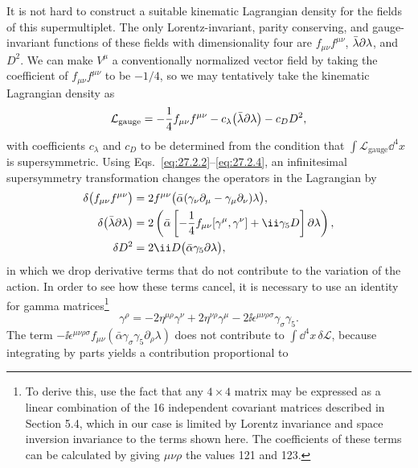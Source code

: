 It is not hard to construct a suitable kinematic Lagrangian density for
the fields of this supermultiplet. The only Lorentz-invariant, parity
conserving, and gauge-invariant functions of these fields with
dimensionality four are \(f_{\mu\nu}f^{\mu\nu}\),
\(\bar\lambda\sl{\partial}\lambda\), and \(D^2\). We can make \(V^\mu\) a
conventionally normalized vector field by taking the coefficient of
\(f_{\mu\nu}f^{\mu\nu}\) to be \(-1/4\), so we may tentatively take the
kinematic Lagrangian density as
\[
  \mathcal{L}_{\mathrm{gauge}}
  =-\frac14 f_{\mu\nu}f^{\mu\nu}
  -c_\lambda\bigl(\bar\lambda\sl{\partial}\lambda\bigr)
  -c_DD^2,
\]
with coefficients \(c_\lambda\) and \(c_D\) to be determined from the
condition that \(\int\mathcal{L}_{\mathrm{gauge}}\dd^4x\) is supersymmetric.
Using Eqs.~\eqref{eq:27.2.2}--\eqref{eq:27.2.4}, an infinitesimal
supersymmetry transformation changes the operators in the Lagrangian by
\[
  \begin{aligned}
  \delta\bigl(f_{\mu\nu}f^{\mu\nu}\bigr)
  &=2f^{\mu\nu}
    \bigl(\bar\alpha(\gamma_\nu\partial_\mu
      -\gamma_\mu\partial_\nu)\lambda\bigr),
  \\
  \delta\bigl(\bar\lambda\sl{\partial}\lambda\bigr)
  &=2\left(
    \bar\alpha\left[-\frac14f_{\mu\nu}[\gamma^\mu,\gamma^\nu]
      +\ii\gamma_5D\right]\sl{\partial}\lambda
  \right),
  \\
  \delta D^2&=2\ii D\bigl(\bar\alpha\gamma_5\sl{\partial}\lambda\bigr),
  \end{aligned}
\]
in which we drop derivative terms that do not contribute to the variation
of the action. In order to see how these terms cancel, it is necessary to
use an identity for gamma matrices\footnote{To derive this, use the fact
that any \(4\times4\) matrix may be expressed as a linear combination of
the 16 independent covariant matrices described in Section 5.4, which in
our case is limited by Lorentz invariance and space inversion invariance
to the terms shown here. The coefficients of these terms can be calculated
by giving \(\mu\nu\rho\) the values 121 and 123.}
\begin{equation}
  [\gamma^\mu,\gamma^\nu]\gamma^\rho
  =-2\eta^{\mu\rho}\gamma^\nu
  +2\eta^{\nu\rho}\gamma^\mu
  -2\ii\epsilon^{\mu\nu\rho\sigma}\gamma_\sigma\gamma_5.
  \tag{27.2.5}\label{eq:27.2.5}
\end{equation}
The term
\(-\ii\epsilon^{\mu\nu\rho\sigma}f_{\mu\nu}
(\bar\alpha\gamma_\sigma\gamma_5\partial_\rho\lambda)\)
does not contribute to \(\int \dd^4x\,\delta\mathcal{L}\), because
integrating by parts yields a contribution proportional to
